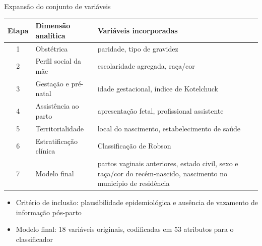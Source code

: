 \documentclass[aspectratio=169,xcolor=table]{beamer}
\begin{document}
\begin{frame}{Expansão do conjunto de variáveis}
    \scriptsize
    \begin{table}
        \centering
        \begin{tabular}{clp{6.2cm}}
            \toprule
            Etapa & Dimensão analítica & Variáveis incorporadas \\
            \midrule
            1 & Obstétrica & paridade, tipo de gravidez \\
            2 & Perfil social da mãe & escolaridade agregada, raça/cor \\
            3 & Gestação e pré-natal & idade gestacional, índice de Kotelchuck \\
            4 & Assistência ao parto & apresentação fetal, profissional assistente \\
            5 & Territorialidade & local do nascimento, estabelecimento de saúde \\
            6 & Estratificação clínica & Classificação de Robson \\
            7 & Modelo final & partos vaginais anteriores, estado civil, sexo e raça/cor do recém-nascido, nascimento no município de residência \\
            \bottomrule
        \end{tabular}
    \end{table}

    \vspace{0.3em}
    \begin{itemize}
        \item Critério de inclusão: plausibilidade epidemiológica e ausência de vazamento de informação pós-parto
        \item Modelo final: 18 variáveis originais, codificadas em 53 atributos para o classificador
    \end{itemize}
\end{frame}
\end{document}
